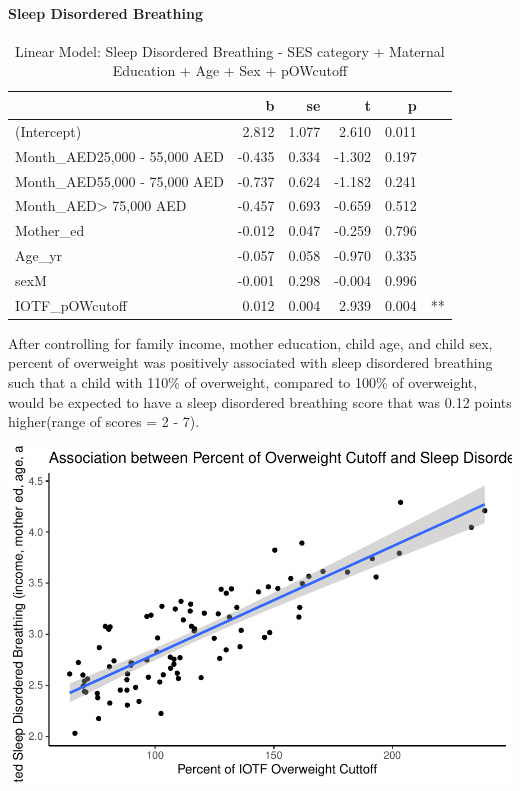 \documentclass[
]{article}
\begin{document}
\FloatBarrier

\FloatBarrier

\hypertarget{sleep-disordered-breathing}{%
\paragraph{Sleep Disordered
Breathing}\label{sleep-disordered-breathing}}

\begin{table}[!h]

\caption{\label{tab:IOTF_pOWcutoff_disbreathing}Linear Model: Sleep Disordered Breathing - SES category + Maternal Education + Age + Sex + pOWcutoff}
\centering
\begin{tabular}[t]{lrrrrl}
\toprule
  & b & se & t & p &  \\
\midrule
(Intercept) & 2.812 & 1.077 & 2.610 & 0.011 & \\
Month\_AED25,000 - 55,000 AED & -0.435 & 0.334 & -1.302 & 0.197 & \\
Month\_AED55,000 - 75,000 AED & -0.737 & 0.624 & -1.182 & 0.241 & \\
Month\_AED> 75,000 AED & -0.457 & 0.693 & -0.659 & 0.512 & \\
Mother\_ed & -0.012 & 0.047 & -0.259 & 0.796 & \\
\addlinespace
Age\_yr & -0.057 & 0.058 & -0.970 & 0.335 & \\
sexM & -0.001 & 0.298 & -0.004 & 0.996 & \\
IOTF\_pOWcutoff & 0.012 & 0.004 & 2.939 & 0.004 & **\\
\bottomrule
\end{tabular}
\end{table}

After controlling for family income, mother education, child age, and
child sex, percent of overweight was positively associated with sleep
disordered breathing such that a child with 110\% of overweight,
compared to 100\% of overweight, would be expected to have a sleep
disordered breathing score that was 0.12 points higher(range of scores =
2 - 7).

\FloatBarrier

\includegraphics{UAE_MedPaper_Figs/fig-IOTF_pOWcutoff_disbreathing_adj_plot-1.pdf}
\end{document}
